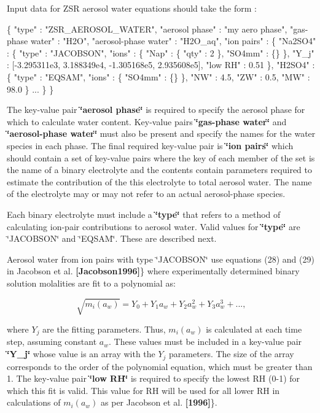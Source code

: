 Input data for Z\+SR aerosol water equations should take the form \+: 
\begin{DoxyCode}
\{
  "type" : "ZSR\_AEROSOL\_WATER",
  "aerosol phase" : "my aero phase",
  "gas-phase water" : "H2O",
  "aerosol-phase water" : "H2O\_aq",
  "ion pairs" : \{
    "Na2SO4" : \{
      "type" : "JACOBSON",
      "ions" : \{
        "Nap" : \{ "qty" : 2 \},
        "SO4mm" : \{\}
      \},
      "Y\_j" : [-3.295311e3, 3.188349e4, -1.305168e5, 2.935608e5],
      "low RH" : 0.51
    \},
    "H2SO4" : \{
      "type" : "EQSAM",
      "ions" : \{
        "SO4mm" : \{\}
      \},
      "NW" : 4.5,
      "ZW" : 0.5,
      "MW" : 98.0
    \}
    ...
  \}
\}
\end{DoxyCode}
 The key-\/value pair {\bfseries \char`\"{}aerosol phase\char`\"{}} is required to specify the aerosol phase for which to calculate water content. Key-\/value pairs {\bfseries \char`\"{}gas-\/phase water\char`\"{}} and {\bfseries \char`\"{}aerosol-\/phase water\char`\"{}} must also be present and specify the names for the water species in each phase. The final required key-\/value pair is {\bfseries \char`\"{}ion pairs\char`\"{}} which should contain a set of key-\/value pairs where the key of each member of the set is the name of a binary electrolyte and the contents contain parameters required to estimate the contribution of the this electrolyte to total aerosol water. The name of the electrolyte may or may not refer to an actual aerosol-\/phase species.

Each binary electrolyte must include a {\bfseries \char`\"{}type\char`\"{}} that refers to a method of calculating ion-\/pair contributions to aerosol water. Valid values for {\bfseries \char`\"{}type\char`\"{}} are \char`\"{}\+J\+A\+C\+O\+B\+S\+O\+N\char`\"{} and \char`\"{}\+E\+Q\+S\+A\+M\char`\"{}. These are described next.

Aerosol water from ion pairs with type \char`\"{}\+J\+A\+C\+O\+B\+S\+O\+N\char`\"{} use equations (28) and (29) in Jacobson et al. {\bfseries [Jacobson1996]}\} where experimentally determined binary solution molalities are fit to a polynomial as\+:

\[ \sqrt{m_{i}(a_w)} = Y_0 + Y_1 a_w + Y_2 a_w^2 + Y_3 a_w^3 + ..., \]

where $Y_j$ are the fitting parameters. Thus, $m_i(a_w)$ is calculated at each time step, assuming constant $a_w$. These values must be included in a key-\/value pair {\bfseries \char`\"{}\+Y\+\_\+j\char`\"{}} whose value is an array with the $Y_j$ parameters. The size of the array corresponds to the order of the polynomial equation, which must be greater than 1. The key-\/value pair {\bfseries \char`\"{}low R\+H\char`\"{}} is required to specify the lowest RH (0-\/1) for which this fit is valid. This value for RH will be used for all lower RH in calculations of $m_i(a_w)$ as per Jacobson et al. {\bfseries [1996]}\}.

